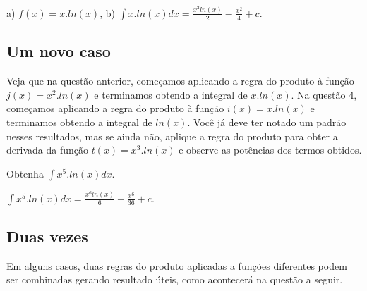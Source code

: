 \documentclass[main_estudante.tex]{subfiles}
\begin{document}
\begin{gabarito}
	\begin{gabaritoQuestao}
		a) $f(x)=x.ln(x)$, b) $\int x.ln(x) dx = \frac{x^2 ln(x)}{2}-\frac{x^2}{4}+c$.
	\end{gabaritoQuestao}
\end{gabarito}

\subsection*{Um novo caso}

Veja que na questão anterior, começamos aplicando a regra do produto à função $j(x)=x^2 . ln(x)$ e terminamos obtendo a integral de $x.ln(x)$. Na questão 4, começamos aplicando a regra do produto à função $i(x)=x . ln(x)$ e terminamos obtendo a integral de $ln(x)$. Você já deve ter notado um padrão nesses resultados, mas se ainda não, aplique a regra do produto para obter a derivada da função $t(x)=x^3. ln(x)$ e observe as potências dos termos obtidos.


\begin{questao}
Obtenha $\int x^5 . ln(x) dx$.
\end{questao}

\begin{gabarito}
	\begin{gabaritoQuestao}
		$\int x^5.ln(x) dx = \frac{x^6 ln(x)}{6}-\frac{x^6}{36}+c$.
	\end{gabaritoQuestao}
\end{gabarito}

\subsection*{Duas vezes}

Em alguns casos, duas regras do produto aplicadas a funções diferentes podem ser combinadas gerando resultado úteis, como acontecerá na questão a seguir.

\end{document}
